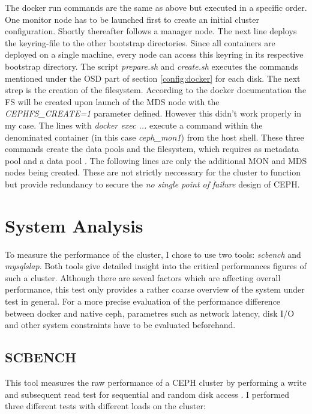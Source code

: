 \documentclass[titlepage, a4paper, 11pt]{scrartcl}
\begin{document}
                The docker run commands are the same as above but executed in a specific order. One monitor node has to be launched first to create an initial cluster configuration.
                Shortly thereafter follows a manager node. The next line deploys the keyring-file to the other bootstrap directories. Since all containers are deployed on a single machine, every node can access this keyring in its respective bootstrap directory. The script \textit{prepare.sh} and \textit{create.sh} executes the commands mentioned under the OSD part of section \ref*{config:docker} for each disk.
                The next strep is the creation of the filesystem. According to the docker documentation the FS will be created upon launch of the MDS node with the \textit{CEPHFS\_CREATE=1} parameter defined. However this didn't work properly in my case. The lines with \textit{docker exec ...} execute a command within the denominated container (in this case 
                \textit{ceph\_mon1}) from the host shell. These three commands create the data pools and the filesystem, which requires as metadata pool and a data pool \cite{CreateaCephfilesystem}.
                The following lines are only the additional MON and MDS nodes being created. These are not strictly neccessary for the cluster to function but provide redundancy to secure the \textit{no single point of failure} design of CEPH.

    \section{System Analysis}

        To measure the performance of the cluster, I chose to use two tools: \textit{scbench} and \textit{mysqlslap}. Both tools give detailed insight into
        the critical performances figures of such a cluster. Although there are seveal factors which are affecting overall performance, this test only provides a rather coarse overview of the system under test in general. For a more precise evaluation of the performance difference between docker and native ceph, parametres such as network latency, disk I/O and other system constraints have to be evaluated beforehand.

        \subsection{SCBENCH} 

            This tool measures the raw performance of a CEPH cluster by performing a write and subsequent read test for sequential and random disk access \cite{cephperformancebenchmark}. I performed three different tests with different loads on the cluster:
\end{document}

